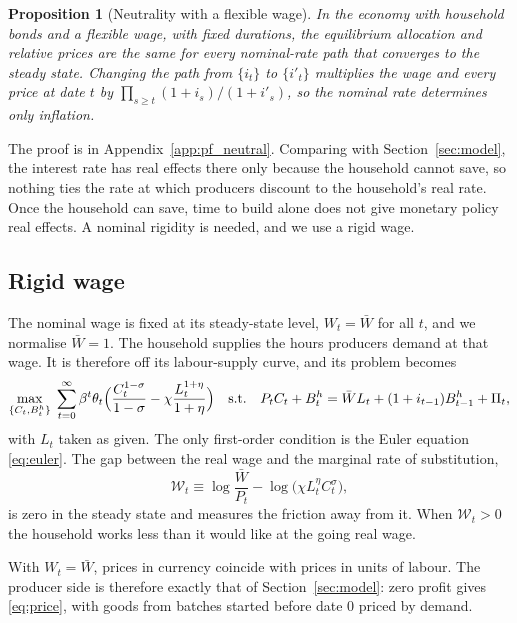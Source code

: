 \documentclass[11pt]{article}
\newtheorem{proposition}{Proposition}
\theoremstyle{definition}
\begin{document}
\begin{proposition}[Neutrality with a flexible wage]\label{prop:neutral}
In the economy with household bonds and a flexible wage, with fixed durations, the equilibrium
allocation and relative prices are the same for every nominal-rate path that converges to the
steady state. Changing the path from $\{i_t\}$ to $\{i'_t\}$ multiplies the wage and every price at
date $t$ by $\prod_{s\ge t}(1+i_s)/(1+i'_s)$, so the nominal rate determines only inflation.
\end{proposition}

\noindent The proof is in Appendix~\ref{app:pf_neutral}. Comparing with Section~\ref{sec:model}, the interest rate
has real effects there only because the household cannot save, so nothing ties the rate at which
producers discount to the household's real rate. Once the household can save, time to build alone does not give monetary
policy real effects. A nominal rigidity is needed, and we use a rigid wage.

\subsection{Rigid wage}\label{sec:rigid}

The nominal wage is fixed at its steady-state level, $W_t=\bar W$ for all $t$, and we normalise
$\bar W=1$. The household supplies the hours producers demand at that wage. It is therefore off its
labour-supply curve, and its problem becomes
\begin{equation}\label{eq:hhrigid}
  \max_{\{C_t,B^h_t\}}\;\sum_{t=0}^{\infty}\beta^t\theta_t
     \Bigl(\frac{C_t^{1-\sigma}}{1-\sigma}-\chi\frac{L_t^{1+\eta}}{1+\eta}\Bigr)
  \quad\text{s.t.}\quad
  P_tC_t+B^h_t=\bar WL_t+(1+i_{t-1})B^h_{t-1}+\Pi_t ,
\end{equation}
with $L_t$ taken as given. The only first-order condition is the Euler equation \eqref{eq:euler}. The gap
between the real wage and the marginal rate of substitution,
\begin{equation}\label{eq:wedge}
  \mathcal W_t\equiv\log\frac{\bar W}{P_t}-\log\bigl(\chi L_t^{\eta}C_t^{\sigma}\bigr),
\end{equation}
is zero in the steady state and measures the friction away from it. When $\mathcal W_t>0$ the
household works less than it would like at the going real wage.

With $W_t=\bar W$, prices in currency coincide with prices in units of labour. The producer side is
therefore exactly that of Section~\ref{sec:model}: zero profit gives \eqref{eq:price}, with goods from
batches started before date 0 priced by demand.
\end{document}
